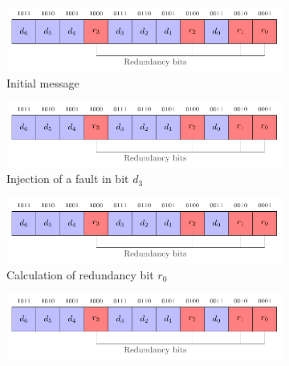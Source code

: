 \begin{figure}[ht]
    \centering
    \begin{subfigure}[b]{0.49\textwidth}
        \includegraphics[width=\textwidth, page=11]{c5_countermeasures_dift/img/hamming_bit.pdf}
        \caption{Initial message}
        \label{fig:hamming_code_faulted_1}
    \end{subfigure}
    \hfill
    \begin{subfigure}[b]{0.49\textwidth}
        \includegraphics[width=\textwidth, page=12]{c5_countermeasures_dift/img/hamming_bit.pdf}
        \caption{Injection of a fault in bit $d_3$}
        \label{fig:hamming_code_faulted_2}
    \end{subfigure}
    \hfill
    \begin{subfigure}[b]{0.49\textwidth}
        \includegraphics[width=\textwidth, page=13]{c5_countermeasures_dift/img/hamming_bit.pdf}
        \caption{Calculation of redundancy bit $r_0$}
        \label{fig:hamming_code_faulted_3}
    \end{subfigure}
    \hfill
    \begin{subfigure}[b]{0.49\textwidth}
        \includegraphics[width=\textwidth, page=14]{c5_countermeasures_dift/img/hamming_bit.pdf}

\end{subfigure}
\end{figure}
